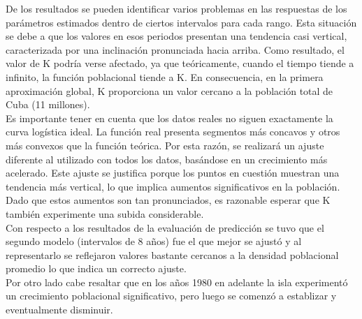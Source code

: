 \documentclass[a4paper,10pt,twocolumn]{article}
\begin{document}
De los resultados se pueden identificar varios problemas en las respuestas de los parámetros estimados dentro de ciertos intervalos para cada rango. Esta situación se debe a que los valores en esos periodos presentan una tendencia casi vertical, caracterizada por una inclinación pronunciada hacia arriba. Como resultado, el valor de K podría verse afectado, ya que teóricamente, cuando el tiempo tiende a infinito, la función poblacional tiende a K. En consecuencia, en la primera aproximación global, K proporciona un valor cercano a la población total de Cuba (11 millones).\\

Es importante tener en cuenta que los datos reales no siguen exactamente la curva logística ideal. La función real presenta segmentos más concavos y otros más convexos que la función teórica. Por esta razón, se realizará un ajuste diferente al utilizado con todos los datos, basándose en un crecimiento más acelerado. Este ajuste se justifica porque los puntos en cuestión muestran una tendencia más vertical, lo que implica aumentos significativos en la población. Dado que estos aumentos son tan pronunciados, es razonable esperar que K también experimente una subida considerable.\\
Con respecto a los resultados de la evaluación de predicción se tuvo que el segundo modelo (intervalos de 8 años) fue el que mejor se ajustó y al representarlo se reflejaron valores bastante cercanos a la densidad poblacional promedio lo que indica un correcto ajuste.\\

Por otro lado cabe resaltar que en los años 1980 en adelante la isla experimentó un crecimiento poblacional significativo, pero luego se comenzó a establizar y eventualmente disminuir.




\end{document}
